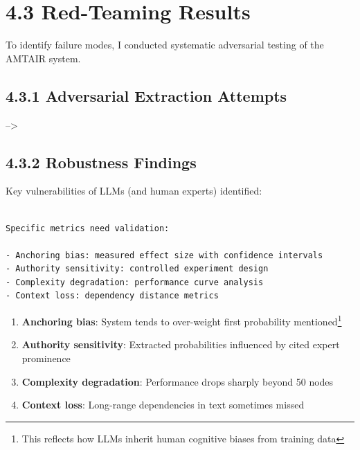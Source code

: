 \documentclass[
  11pt,
  letterpaper,
]{book}
\providecommand{\tightlist}{%
  \setlength{\itemsep}{0pt}\setlength{\parskip}{0pt}}
\begin{document}
\section*{4.3 Red-Teaming Results}\label{sec-red-teaming}


To identify failure modes, I conducted systematic adversarial testing of
the AMTAIR system.

\subsection*{4.3.1 Adversarial Extraction
Attempts}\label{sec-adversarial-extraction}

--\textgreater{}

\subsection*{4.3.2 Robustness Findings}\label{sec-robustness-findings}

Key vulnerabilities of LLMs (and human experts) identified:

\begin{verbatim}

Specific metrics need validation:

- Anchoring bias: measured effect size with confidence intervals
- Authority sensitivity: controlled experiment design
- Complexity degradation: performance curve analysis
- Context loss: dependency distance metrics
\end{verbatim}

\begin{enumerate}
\def\labelenumi{\arabic{enumi}.}
\tightlist
\item
  \textbf{Anchoring bias}: System tends to over-weight first probability
  mentioned\footnote{This reflects how LLMs inherit human cognitive
    biases from training data}
\item
  \textbf{Authority sensitivity}: Extracted probabilities influenced by
  cited expert prominence
\item
  \textbf{Complexity degradation}: Performance drops sharply beyond 50
  nodes
\item
  \textbf{Context loss}: Long-range dependencies in text sometimes
  missed
\end{enumerate}
\end{document}
